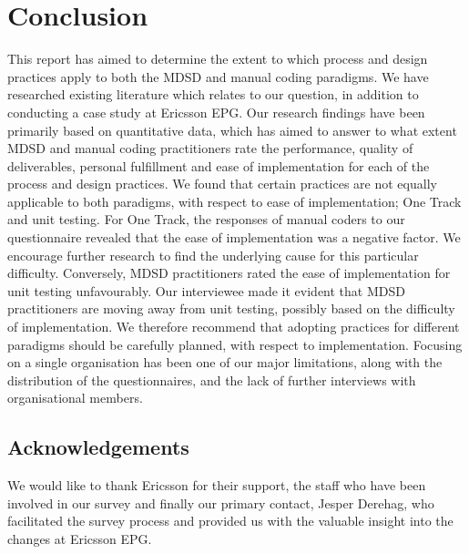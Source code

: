 \documentclass[fina_report_innit.tex]{subfiles}
\begin{document}
\section{Conclusion}
This report has aimed to determine the extent to which process and design practices apply to both the MDSD and manual coding paradigms. We have researched existing literature which relates to our question, in addition to conducting a case study at Ericsson EPG. Our research findings have been primarily based on quantitative data, which has aimed to answer to what extent MDSD and manual coding practitioners rate the performance, quality of deliverables, personal fulfillment and ease of implementation for each of the process and design practices. We found that certain practices are not equally applicable to both paradigms, with respect to ease of implementation; One Track and unit testing. For One Track, the responses of manual coders to our questionnaire revealed that the ease of implementation was a negative factor. We encourage further research to find the underlying cause for this particular difficulty. Conversely, MDSD practitioners rated the ease of implementation for unit testing unfavourably. Our interviewee made it evident that MDSD practitioners are moving away from unit testing, possibly based on the difficulty of implementation. We therefore recommend that adopting practices for different paradigms should be carefully planned, with respect to implementation. Focusing on a single organisation has been one of our major limitations, along with the distribution of the questionnaires, and the lack of further interviews with organisational members. 


\subsection*{Acknowledgements}
We would like to thank Ericsson for their support, the staff who have been involved in our survey and finally our primary contact, Jesper Derehag, who facilitated the survey process and provided us with the valuable insight into the changes at Ericsson EPG.
\end{document}
